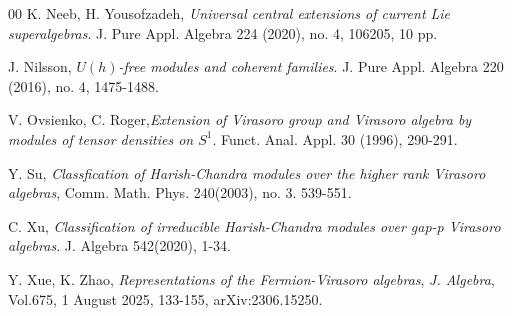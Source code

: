 \documentclass[1p]{elsarticle}
\numberwithin{equation}{section}
\begin{document}
\begin{thebibliography}{00}
 K. Neeb,  H. Yousofzadeh, {\it Universal central extensions of current Lie superalgebras}. J. Pure Appl. Algebra 224 (2020), no. 4, 106205, 10 pp.

 J. Nilsson, {\it $U(h)$-free modules and coherent families}.  J. Pure Appl. Algebra 220 (2016), no. 4, 1475-1488.

 V. Ovsienko, C. Roger,{\it Extension of Virasoro group and Virasoro algebra by modules of tensor
densities on $S^1$}. Funct. Anal. Appl. 30 (1996), 290-291.



  Y. Su, {\it Classfication of Harish-Chandra modules over the higher rank Virasoro algebras}, Comm. Math. Phys. 240(2003), no. 3. 539-551.

 C. Xu, {\it Classification of irreducible Harish-Chandra modules over gap-p Virasoro algebras}. J. Algebra 542(2020), 1-34.

 Y. Xue, K. Zhao, {\it Representations of the Fermion-Virasoro algebras}, {\it J. Algebra}, Vol.675, 1 August 2025,   133-155, arXiv:2306.15250.

\end{thebibliography}
\end{document}
